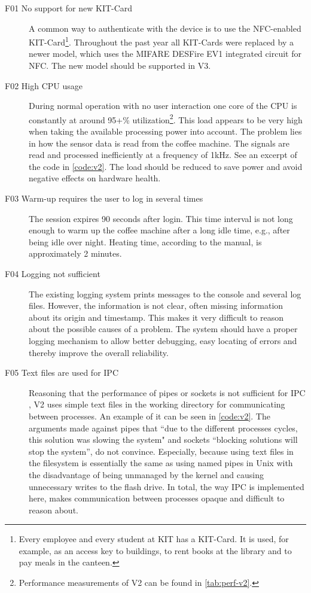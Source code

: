 \documentclass[12pt]{article}
\begin{document}
\begin{description}
\item [F01 No support for new KIT-Card]
\label{pa:F01}
A common way to authenticate with the device is to use the NFC-enabled KIT-Card\footnote{
  Every employee and every student at KIT has a KIT-Card.
  It is used, for example, as an access key to buildings, to rent books at the library
  and to pay meals in the canteen.}.
Throughout the past year all KIT-Cards were replaced by a newer model,
which uses the MIFARE DESFire EV1 integrated circuit for NFC.
The new model should be supported in V3.

\item [F02 High CPU usage]
\label{pa:F02}
During normal operation with no user interaction one core of the CPU
is constantly at around 95+\% utilization\footnote{Performance measurements of V2 can be found in \autoref{tab:perf-v2}.}.
This load appears to be very high when taking the available processing power into account.
The problem lies in how the sensor data is read from the coffee machine.
The signals are read and processed inefficiently at a frequency of 1kHz.
See an excerpt of the code in \autoref{code:v2}.
The load should be reduced to save power and avoid negative effects on hardware health.

\item [F03 Warm-up requires the user to log in several times]\hspace*{\fill}
\label{pa:F03}
The session expires 90 seconds after login.
This time interval is not long enough to warm up the coffee machine after a long idle time, e.g., after being idle over night.
Heating time, according to the manual, is approximately 2 minutes.

\item [F04 Logging not sufficient]
\label{pa:F04}
The existing logging system prints messages to the console and several log files.
However, the information is not clear, often missing information about its origin and timestamp.
This makes it very difficult to reason about the possible causes of a problem.
The system should have a proper logging mechanism to allow better debugging,
easy locating of errors and thereby improve the overall reliability.

\item [F05 Text files are used for IPC]%
\label{pa:F05}
Reasoning that the performance of pipes or sockets is not sufficient for IPC \cite[3.3.5]{Thesis2},
V2 uses simple text files in the working directory for communicating between processes.
An example of it can be seen in \autoref{code:v2}.
The arguments made against pipes that ``due to the different processes cycles, this solution was slowing the system"
and sockets ``blocking solutions will stop the system'', do not convince.
Especially, because using text files in the filesystem is essentially the same as using named pipes in Unix
with the disadvantage of being unmanaged by the kernel and causing unnecessary writes to the flash drive.
In total, the way IPC is implemented here, makes communication between processes opaque and difficult to reason about.


\end{description}
\end{document}
